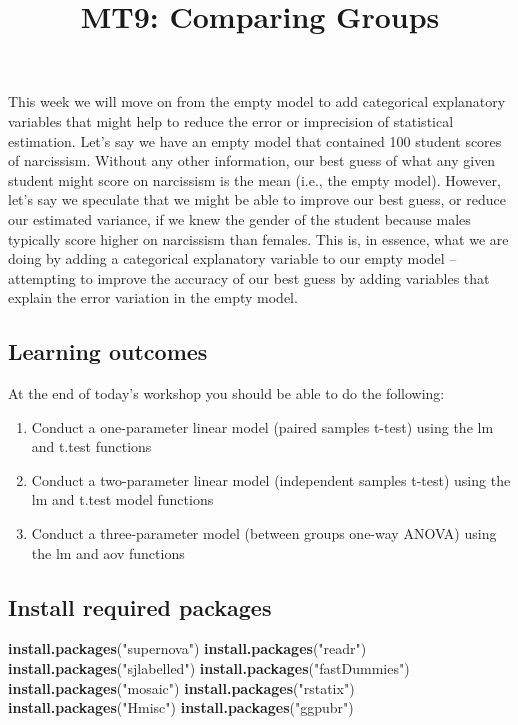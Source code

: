 \documentclass[
]{article}
\title{MT9: Comparing Groups}
\author{}
\date{\vspace{-2.5em}}
\newenvironment{Shaded}{\begin{snugshade}}{\end{snugshade}}
\newcommand{\FunctionTok}[1]{\textcolor[rgb]{0.13,0.29,0.53}{\textbf{#1}}}
\newcommand{\NormalTok}[1]{#1}
\newcommand{\StringTok}[1]{\textcolor[rgb]{0.31,0.60,0.02}{#1}}
\begin{document}
\maketitle

This week we will move on from the empty model to add categorical
explanatory variables that might help to reduce the error or imprecision
of statistical estimation. Let's say we have an empty model that
contained 100 student scores of narcissism. Without any other
information, our best guess of what any given student might score on
narcissism is the mean (i.e., the empty model). However, let's say we
speculate that we might be able to improve our best guess, or reduce our
estimated variance, if we knew the gender of the student because males
typically score higher on narcissism than females. This is, in essence,
what we are doing by adding a categorical explanatory variable to our
empty model -- attempting to improve the accuracy of our best guess by
adding variables that explain the error variation in the empty model.

\subsection{Learning outcomes}\label{learning-outcomes}

At the end of today's workshop you should be able to do the following:

\begin{enumerate}
\def\labelenumi{\arabic{enumi}.}
\item
  Conduct a one-parameter linear model (paired samples t-test) using the
  lm and t.test functions
\item
  Conduct a two-parameter linear model (independent samples t-test)
  using the lm and t.test model functions
\item
  Conduct a three-parameter model (between groups one-way ANOVA) using
  the lm and aov functions
\end{enumerate}

\subsection{Install required packages}\label{install-required-packages}

\begin{Shaded}
\begin{Highlighting}[]
\FunctionTok{install.packages}\NormalTok{(}\StringTok{"supernova"}\NormalTok{)}
\FunctionTok{install.packages}\NormalTok{(}\StringTok{"readr"}\NormalTok{)}
\FunctionTok{install.packages}\NormalTok{(}\StringTok{"sjlabelled"}\NormalTok{)}
\FunctionTok{install.packages}\NormalTok{(}\StringTok{"fastDummies"}\NormalTok{)}
\FunctionTok{install.packages}\NormalTok{(}\StringTok{"mosaic"}\NormalTok{)}
\FunctionTok{install.packages}\NormalTok{(}\StringTok{"rstatix"}\NormalTok{)}
\FunctionTok{install.packages}\NormalTok{(}\StringTok{"Hmisc"}\NormalTok{)}
\FunctionTok{install.packages}\NormalTok{(}\StringTok{"ggpubr"}\NormalTok{)}
\end{Highlighting}
\end{Shaded}
\end{document}
